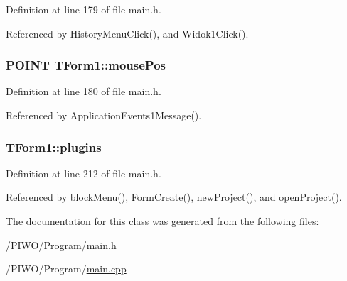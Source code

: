 Definition at line 179 of file main.h.

Referenced by HistoryMenuClick(), and Widok1Click().\hypertarget{classTForm1_427dabcbbd77fff9d3354f2849333b44}{
\subsubsection[mousePos]{\setlength{\rightskip}{0pt plus 5cm}POINT {\bf TForm1::mousePos}}}
\label{classTForm1_427dabcbbd77fff9d3354f2849333b44}




Definition at line 180 of file main.h.

Referenced by ApplicationEvents1Message().\hypertarget{classTForm1_d9cbc2c28df5c7941456e1333281ac43}{
\subsubsection[plugins]{ {\bf TForm1::plugins}}}
\label{classTForm1_d9cbc2c28df5c7941456e1333281ac43}




Definition at line 212 of file main.h.

Referenced by blockMenu(), FormCreate(), newProject(), and openProject().

The documentation for this class was generated from the following files:\begin{CompactItemize}
\item 
/PIWO/Program/\hyperlink{main_8h}{main.h}\item 
/PIWO/Program/\hyperlink{main_8cpp}{main.cpp}\end{CompactItemize}
